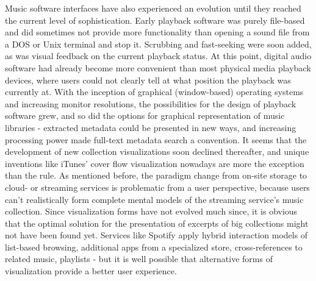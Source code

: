 Music software interfaces have also experienced an evolution until they reached the current level of sophistication. Early playback software was purely file-based and did sometimes not provide more functionality than opening a sound file from a DOS or Unix terminal and stop it. Scrubbing and fast-seeking were soon added, as was visual feedback on the current playback status. At this point, digital audio software had already become more convenient than most physical media playback devices, where users could not clearly tell at what position the playback was currently at. With the inception of graphical (window-based) operating systems and increasing monitor resolutions, the possibilities for the design of playback software grew, and so did the options for graphical representation of music libraries - extracted metadata could be presented in new ways, and increasing processing power made full-text metadata search a convention. It seems that the development of new collection visualizations soon declined thereafter, and unique inventions like iTunes' cover flow visualization nowadays are more the exception than the rule. As mentioned before, the paradigm change from on-site storage to cloud- or streaming services is problematic from a user perspective, because users can't realistically form complete mental models of the streaming service's music collection. Since visualization forms have not evolved much since, it is obvious that the optimal solution for the presentation of excerpts of big collections might not have been found yet. Services like Spotify apply hybrid interaction models of list-based browsing, additional apps from a specialized store, cross-references to related music, playlists - but it is well possible that alternative forms of visualization provide a better user experience.

